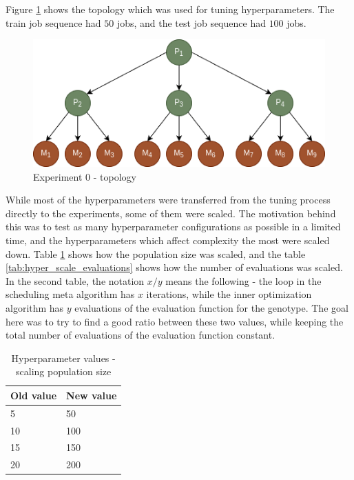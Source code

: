 Figure \ref{fig:experiment0_topology} shows the topology which was used for tuning hyperparameters. The train job sequence had $50$ jobs, and the test job sequence had $100$ jobs.

\begin{figure}[!htbp]
	\centering
	\includegraphics[scale=0.6]{../images/experiment0_topology.png}
	\caption{Experiment 0 - topology}
    \label{fig:experiment0_topology}
\end{figure}

While most of the hyperparameters were transferred from the tuning process directly to the experiments, some of them were scaled. The motivation behind this was to test as many hyperparameter configurations as possible in a limited time, and the hyperparameters which affect complexity the most were scaled down. Table \ref{tab:hyper_scale_population} shows how the population size was scaled, and the table \ref{tab:hyper_scale_evaluations} shows how the number of evaluations was scaled. In the second table, the notation $x/y$ means the following - the loop in the scheduling meta algorithm has $x$ iterations, while the inner optimization algorithm has $y$ evaluations of the evaluation function for the genotype. The goal here was to try to find a good ratio between these two values, while keeping the total number of evaluations of the evaluation function constant.

\begin{table}[!htbp]
    \begin{center}
        \begin{tabular}{|l|l|} 
         \hline
            Old value & New value \\ [0.5ex] \hline\hline
            5 & 50 \\
            \hline
            10 & 100 \\
            \hline
            15 & 150 \\
            \hline
            20 & 200 \\
            \hline
        \end{tabular}
    \end{center}
    \caption{Hyperparameter values - scaling population size}
\label{tab:hyper_scale_population}
\end{table}

